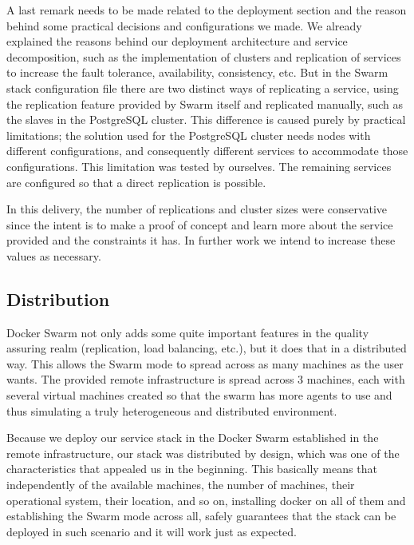 \documentclass[12pt]{article}
\begin{document}
A last remark needs to be made related to the deployment section and the reason behind some practical decisions and configurations we made. We already explained the reasons behind our deployment architecture and service decomposition, such as the implementation of clusters and replication of services to increase the fault tolerance, availability, consistency, etc. But in the Swarm stack configuration file there are two distinct ways of replicating a service, using the replication feature provided by Swarm itself and replicated manually, such as the slaves in the PostgreSQL cluster. This difference is caused purely by practical limitations; the solution used for the PostgreSQL cluster needs nodes with different configurations, and consequently different services to accommodate those configurations. This limitation  was tested by ourselves. The remaining services are configured so that a direct replication is possible.

In this delivery, the number of replications and cluster sizes were conservative since the intent is to make a proof of concept and learn more about the service provided and the constraints it has. In further work we intend to increase these values as necessary.

\subsection{Distribution} \label{strategy.distribution} %


Docker Swarm not only adds some quite important features in the quality assuring realm (replication, load balancing, etc.), but it does that in a distributed way. 
This allows the Swarm mode to spread across as many machines as the user wants. 
The provided remote infrastructure is spread across 3 machines, each with several virtual machines created so that the swarm has more agents to use and thus 
simulating a truly heterogeneous and distributed environment.

Because we deploy our service stack in the Docker Swarm established in the remote infrastructure, our stack was distributed by design, which was one of the 
characteristics that appealed us in the beginning. 
This basically means that independently of the available machines, the number of machines, their operational system, their location, and so on, installing docker 
on all of them and establishing the Swarm mode across all, safely guarantees that the stack can be deployed in such scenario and it will work just as expected.
\end{document}
